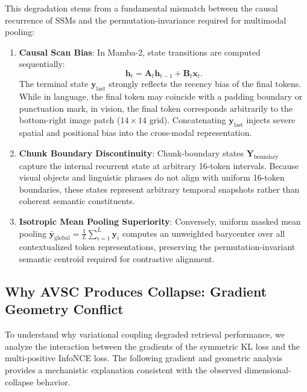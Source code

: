 \documentclass[10pt,journal,final]{IEEEtran}
\begin{document}
This degradation stems from a fundamental mismatch between the causal recurrence of SSMs and the permutation-invariance required for multimodal pooling:
\begin{enumerate}
    \item \textbf{Causal Scan Bias}: In Mamba-2, state transitions are computed sequentially:
    \begin{equation}
    \label{eq:mamba_recurrence}
    \mathbf{h}_t = \mathbf{A}_t \mathbf{h}_{t-1} + \mathbf{B}_t \mathbf{x}_t.
    \end{equation}
    The terminal state $\mathbf{y}_{\mathrm{last}}$ strongly reflects the recency bias of the final tokens. While in language, the final token may coincide with a padding boundary or punctuation mark, in vision, the final token corresponds arbitrarily to the bottom-right image patch ($14 \times 14$ grid). Concatenating $\mathbf{y}_{\mathrm{last}}$ injects severe spatial and positional bias into the cross-modal representation.
    \item \textbf{Chunk Boundary Discontinuity}: Chunk-boundary states $\mathbf{Y}_{\mathrm{boundary}}$ capture the internal recurrent state at arbitrary 16-token intervals. Because visual objects and linguistic phrases do not align with uniform 16-token boundaries, these states represent arbitrary temporal snapshots rather than coherent semantic constituents.
    \item \textbf{Isotropic Mean Pooling Superiority}: Conversely, uniform masked mean pooling $\bar{\mathbf{y}}_{\mathrm{global}} = \frac{1}{L}\sum_{i=1}^L \mathbf{y}_i$ computes an unweighted barycenter over all contextualized token representations, preserving the permutation-invariant semantic centroid required for contrastive alignment.
\end{enumerate}

\subsection{Why AVSC Produces Collapse: Gradient Geometry Conflict}
To understand why variational coupling degraded retrieval performance, we analyze the interaction between the gradients of the symmetric KL loss and the multi-positive InfoNCE loss. The following gradient and geometric analysis provides a mechanistic explanation consistent with the observed dimensional-collapse behavior.
\end{document}
